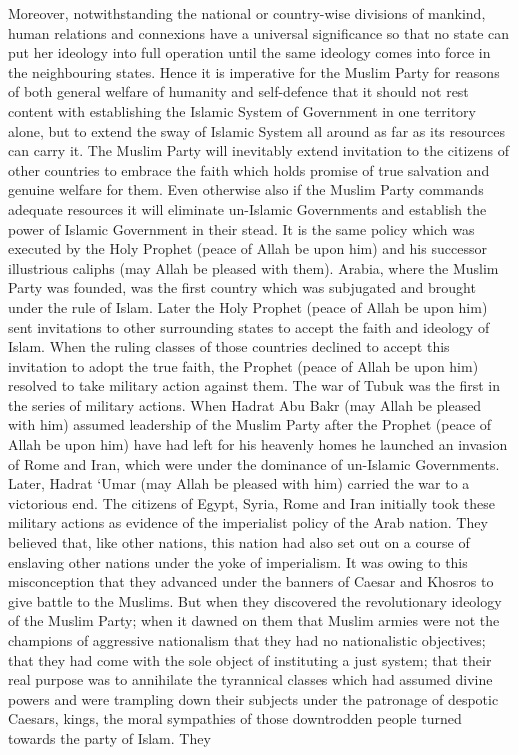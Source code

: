 Moreover, notwithstanding the national or country-wise divisions of
mankind, human relations and connexions have a universal significance so
that no state can put her ideology into full operation until the same
ideology comes into force in the neighbouring states. Hence it is
imperative for the Muslim Party for reasons of both general welfare of
humanity and self-defence that it should not rest content with
establishing the Islamic System of Government in one territory alone,
but to extend the sway of Islamic System all around as far as its
resources can carry it. The Muslim Party will inevitably extend
invitation to the citizens of other countries to embrace the faith which
holds promise of true salvation and genuine welfare for them. Even
otherwise also if the Muslim Party commands adequate resources it will
eliminate un-Islamic Governments and establish the power of Islamic
Government in their stead. It is the same policy which was executed by
the Holy Prophet (peace of Allah be upon him) and his successor
illustrious caliphs (may Allah be pleased with them). Arabia, where the
Muslim Party was founded, was the first country which was subjugated and
brought under the rule of Islam. Later the Holy Prophet (peace of Allah
be upon him) sent invitations to other surrounding states to accept the
faith and ideology of Islam. When the
ruling classes of those countries declined to accept this invitation to
adopt the true faith, the Prophet (peace of Allah be upon him) resolved
to take military action against them. The war of Tubuk was the first in
the series of military actions. When Hadrat Abu Bakr (may Allah be
pleased with him) assumed leadership of the Muslim Party after the
Prophet (peace of Allah be upon him) have had left for his heavenly
homes he launched an invasion of Rome and Iran, which were under the
dominance of un-Islamic Governments. Later, Hadrat `Umar (may Allah be
pleased with him) carried the war to a victorious end. The citizens of
Egypt, Syria, Rome and Iran initially took these military actions as
evidence of the imperialist policy of the Arab nation. They believed
that, like other nations, this nation had also set out on a course of
enslaving other nations under the yoke of imperialism. It was owing to
this misconception that they advanced under the banners of Caesar and
Khosros to give battle to the Muslims. But when they discovered the
revolutionary ideology of the Muslim Party; when it dawned on them that
Muslim armies were not the champions of aggressive nationalism that they
had no nationalistic objectives; that they had come with the sole object
of instituting a just system; that their real purpose was to annihilate
the tyrannical classes which had assumed divine powers and were
trampling down their subjects under the patronage of despotic Caesars,
kings, the moral sympathies of those downtrodden people turned towards
the party of Islam. They

